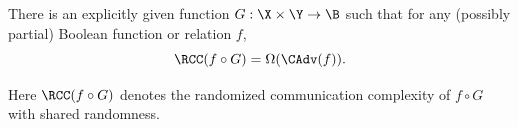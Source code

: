\begin{theorem}\label{thm:CAdv_lift}
There is an explicitly given function $G:\X\times\Y\to\B$ such that for any (possibly partial) Boolean function or relation $f$,
\[\RCC(f\circ G)=\Omega(\CAdv(f)).\]
\end{theorem}
Here $\RCC(f\circ G)$ denotes the randomized communication complexity of $f\circ G$ with shared randomness.
